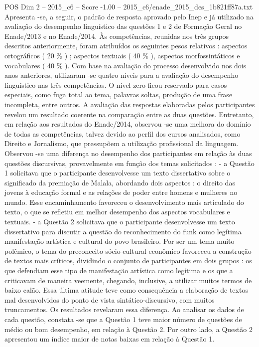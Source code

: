 \begin{textsample}{POS Dim 2 – 2015\_c6 – Score -1.00 – 2015\_c6/enade\_2015\_des\_1b821ff87a.txt}
Apresenta -se, a seguir, o padrão de resposta aprovado pelo Inep e já utilizado na avaliação do desempenho linguístico das questões 1 e 2 de Formação Geral no Enade/2013 e no Enade/2014.
Às competências, reunidas nos três grupos descritos anteriormente, foram atribuídos os seguintes pesos relativos : aspectos ortográficos ( 20 \% ) ; aspectos textuais ( 40 \% ), aspectos morfossintáticos e vocabulares ( 40 \% ).
Com base na avaliação do processo desenvolvido nos dois anos anteriores, utilizaram -se quatro níveis para a avaliação do desempenho linguístico nas três competências.
O nível zero ficou reservado para casos especiais, como fuga total ao tema, palavras soltas, produção de uma frase incompleta, entre outros.
A avaliação das respostas elaboradas pelos participantes revelou um resultado coerente na comparação entre as duas questões.
Entretanto, em relação aos resultados do Enade/2014, observou -se uma melhora do domínio de todas as competências, talvez devido ao perfil dos cursos analisados, como Direito e Jornalismo, que pressupõem a utilização profissional da linguagem.
Observou -se uma diferença no desempenho dos participantes em relação às duas questões discursivas, provavelmente em função dos temas solicitados : - a Questão 1 solicitava que o participante desenvolvesse um texto dissertativo sobre o significado da premiação de Malala, abordando dois aspectos : o direito das jovens à educação formal e as relações de poder entre homens e mulheres no mundo.
Esse encaminhamento favoreceu o desenvolvimento mais articulado do texto, o que se refletiu em melhor desempenho dos aspectos vocabulares e textuais. - a Questão 2 solicitava que o participante desenvolvesse um texto dissertativo para discutir a questão do reconhecimento do funk como legítima manifestação artística e cultural do povo brasileiro.
Por ser um tema muito polêmico, o tema do preconceito sócio-cultural-econômico favoreceu a construção de textos mais críticos, dividindo o conjunto de participantes em dois grupos : os que defendiam esse tipo de manifestação artística como legítima e os que a criticavam de maneira veemente, chegando, inclusive, a utilizar muitos termos de baixo calão.
Essa última atitude teve como consequência a elaboração de textos mal desenvolvidos do ponto de vista sintático-discursivo, com muitos truncamentos.
Os resultados revelaram essa diferença.
Ao analisar os dados de cada questão, constata -se que a Questão 1 teve maior número de questões de médio ou bom desempenho, em relação à Questão 2.
Por outro lado, a Questão 2 apresentou um índice maior de notas baixas em relação à Questão 1.

\end{textsample}
